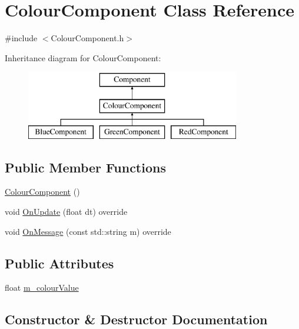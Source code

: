 \hypertarget{class_colour_component}{}\section{Colour\+Component Class Reference}
\label{class_colour_component}


{\ttfamily \#include $<$Colour\+Component.\+h$>$}

Inheritance diagram for Colour\+Component\+:\begin{figure}[H]
\begin{center}
\leavevmode
\includegraphics[height=3.000000cm]{class_colour_component}
\end{center}
\end{figure}
\subsection*{Public Member Functions}
\begin{DoxyCompactItemize}
\item 
\mbox{\hyperlink{class_colour_component_aea6cf99fa40f6ed6d670e89fab944b1c}{Colour\+Component}} ()
\item 
void \mbox{\hyperlink{class_colour_component_ae45e91aebb680031bb1328c7c189ea15}{On\+Update}} (float dt) override
\item 
void \mbox{\hyperlink{class_colour_component_a40b859f0c124ddbe92ff1e53bdb398a0}{On\+Message}} (const std\+::string m) override
\end{DoxyCompactItemize}
\subsection*{Public Attributes}
\begin{DoxyCompactItemize}
\item 
float \mbox{\hyperlink{class_colour_component_a58d3b68b7fdbf8acc74c043a05371216}{m\+\_\+colour\+Value}}
\end{DoxyCompactItemize}


\subsection{Constructor \& Destructor Documentation}
\mbox{\label{class_colour_component_aea6cf99fa40f6ed6d670e89fab944b1c}} 
